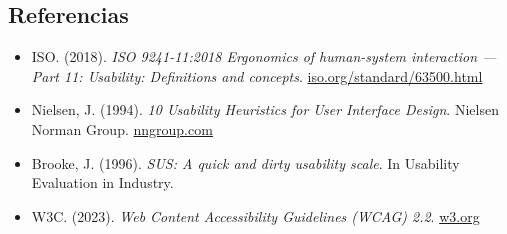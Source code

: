 \documentclass{article}
\begin{document}
\subsection{Referencias}
\begin{itemize}[leftmargin=1.5em, itemsep=2pt]
    \item ISO. (2018). \textit{ISO 9241-11:2018 Ergonomics of human-system interaction — Part 11: Usability: Definitions and concepts}. \href{https://www.iso.org/standard/63500.html}{iso.org/standard/63500.html}
    \item Nielsen, J. (1994). \textit{10 Usability Heuristics for User Interface Design}. Nielsen Norman Group. \href{https://www.nngroup.com/articles/ten-usability-heuristics/}{nngroup.com}
    \item Brooke, J. (1996). \textit{SUS: A quick and dirty usability scale}. In Usability Evaluation in Industry.
    \item W3C. (2023). \textit{Web Content Accessibility Guidelines (WCAG) 2.2}. \href{https://www.w3.org/TR/WCAG22/}{w3.org}
\end{itemize}
\end{document}
